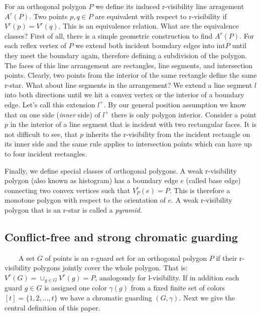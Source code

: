 \documentclass[a4paper,USenglish,numberwithinsect]{lipics}
\theoremstyle{plain}
\begin{document}
For an orthogonal polygon $P$  we define its induced  r-visibility line
arragement $A^r(P)$.
 Two points $p,q\in P$ are equivalent with respect to r-visibility if
$V^r(p)=V^r(q)$.
This is an equivalence relation. What are the equivalence classes? 
First of all, there is a simple geometric construction to find $A^r(P)$.
For each reflex vertex of $P$ we extend both incident boundary edges
into  $\mbox{int}P$ until they meet the boundary again, therefore
defining a subdivision of the polygon. The faces of this line
arrangement are rectangles, line segments, and intersection points.
Clearly, two points from the interior of the same rectangle define the
same r-star. What about line segments in the arrangement? We extend a
line segment $l$ into both directions until we hit a convex vertex or
the interior of a boundary edge. Let's call this extension $l^+$. By our
general position assumption we know that on one side
 ({\it inner} side) of $l^+$ there is only polygon interior.  Consider a
point $p$ in the interior of a line segment that is incident with two
rectangular faces. It is not difficult to see, that $p$    inherits the
r-visibility from the incident rectangle on its inner side and the same
rule applies to intersection points which can have up to four incident
rectangles.

Finally, we define special classes of orthogonal polygons. A weak
r-visibility polygon (also known as histogram) has a boundary edge $e$
(called base edge) connecting two convex vertices such that
$V^r_P(e)=P$. This is therefore a monotone polygon with respect to  the
orientation of $e$. A weak r-visibility polygon that is an r-star is
called a {\it pyramid}.   


\subsection{Conflict-free and strong chromatic guarding}
\ \ \ \ A set $G$ of points is an r-guard set for an orthogonal polygon $P$ if their r-visibility polygons
jointly  cover the whole polygon. That is: $V^r(G)=\cup_{g\in
G}V^r(g)=P$, analogously for l-visibility. If in addition  each guard
$g\in G$ is assigned one color $\gamma(g)$ from a fixed finite set of
colors $[t]=\{1,2,\ldots ,t\}$ we have a chromatic guarding $(G,\gamma)$.
Next we give the central
definition of this paper.
\end{document}
